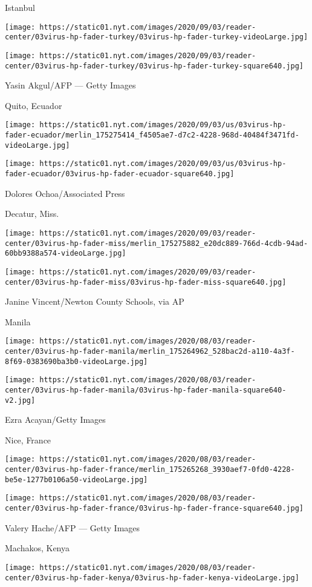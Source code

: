 Istanbul

\texttt{[image: https://static01.nyt.com/images/2020/09/03/reader-center/03virus-hp-fader-turkey/03virus-hp-fader-turkey-videoLarge.jpg]}

\texttt{[image: https://static01.nyt.com/images/2020/09/03/reader-center/03virus-hp-fader-turkey/03virus-hp-fader-turkey-square640.jpg]}

 Yasin Akgul/AFP --- Getty Images

Quito, Ecuador

\texttt{[image: https://static01.nyt.com/images/2020/09/03/us/03virus-hp-fader-ecuador/merlin\_175275414\_f4505ae7-d7c2-4228-968d-40484f3471fd-videoLarge.jpg]}

\texttt{[image: https://static01.nyt.com/images/2020/09/03/us/03virus-hp-fader-ecuador/03virus-hp-fader-ecuador-square640.jpg]}

 Dolores Ochoa/Associated Press

Decatur, Miss.

\texttt{[image: https://static01.nyt.com/images/2020/09/03/reader-center/03virus-hp-fader-miss/merlin\_175275882\_e20dc889-766d-4cdb-94ad-60bb9388a574-videoLarge.jpg]}

\texttt{[image: https://static01.nyt.com/images/2020/09/03/reader-center/03virus-hp-fader-miss/03virus-hp-fader-miss-square640.jpg]}

 Janine Vincent/Newton County Schools, via AP

Manila

\texttt{[image: https://static01.nyt.com/images/2020/08/03/reader-center/03virus-hp-fader-manila/merlin\_175264962\_528bac2d-a110-4a3f-8f69-0383690ba3b0-videoLarge.jpg]}

\texttt{[image: https://static01.nyt.com/images/2020/08/03/reader-center/03virus-hp-fader-manila/03virus-hp-fader-manila-square640-v2.jpg]}

 Ezra Acayan/Getty Images

Nice, France

\texttt{[image: https://static01.nyt.com/images/2020/08/03/reader-center/03virus-hp-fader-france/merlin\_175265268\_3930aef7-0fd0-4228-be5e-1277b0106a50-videoLarge.jpg]}

\texttt{[image: https://static01.nyt.com/images/2020/08/03/reader-center/03virus-hp-fader-france/03virus-hp-fader-france-square640.jpg]}

 Valery Hache/AFP --- Getty Images

Machakos, Kenya

\texttt{[image: https://static01.nyt.com/images/2020/08/03/reader-center/03virus-hp-fader-kenya/03virus-hp-fader-kenya-videoLarge.jpg]}

